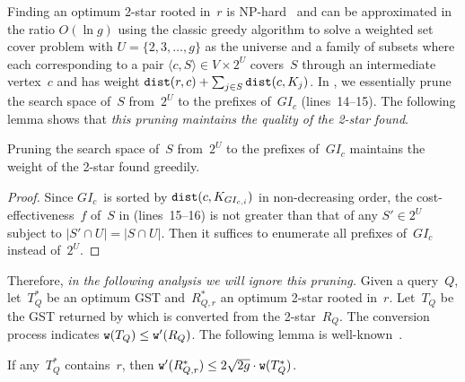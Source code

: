 Finding an optimum 2-star rooted in~$r$ is NP-hard~\cite{dstar1} and can be approximated in the ratio $O(\ln{g})$ using the classic greedy algorithm to solve a weighted set cover problem with $U = \{2,3,\dots,g\}$ as the universe and a family of subsets where each corresponding to a pair $\langle c,S \rangle \in V \times 2^U$ covers~$S$ through an intermediate vertex~$c$ and has weight $\mathtt{dist}(r,c)+\sum_{j \in S}\mathtt{dist}(c,K_j)$. In \Basic, we essentially prune the search space of~$S$ from~$2^U$ to the prefixes of~$GI_c$ (lines~14--15). The following lemma shows that \emph{this pruning maintains the quality of the 2-star found}.

\begin{lemma}
\label{lem: useful_subset}
    Pruning the search space of~$S$ from~$2^U$ to the prefixes of~$GI_c$ maintains the weight of the 2-star found greedily.
\end{lemma}
\begin{proof}
    Since $GI_c$~is sorted by $\mathtt{dist}(c,K_{GI_{c,i}})$ in non-decreasing order, the cost-effectiveness~$f$ of~$S$ in \Basic (lines~15--16) is not greater than that of any $S' \in 2^U$ subject to $|S' \cap U|=|S \cap U|$. Then it suffices to enumerate all prefixes of~$GI_c$ instead of~$2^U$.
\end{proof}


Therefore, \emph{in the following analysis we will ignore this pruning.} Given a query~$Q$, let~$T^*_{Q}$ be an optimum GST and~$R^*_{Q,r}$ an optimum 2-star rooted in~$r$. Let~$T_{Q}$ be the GST returned by \Basic which is converted from the 2-star~$R_Q$. The conversion process indicates $\mathtt{w}(T_{Q})\leq\mathtt{w}'(R_{Q})$. The following lemma is well-known~\cite{dstar2}.

\begin{lemma}
\label{lem: 2star_appr}
If any~$T^*_{Q}$ contains~$r$, then $\mathtt{w}'(R^*_{Q,r}) \leq 2\sqrt{2g}\cdot\mathtt{w}(T^*_{Q})$.
\end{lemma}



